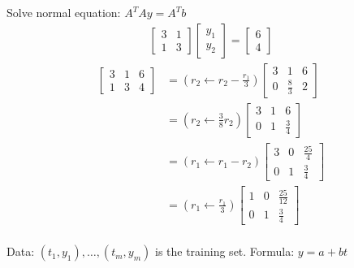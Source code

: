 \documentclass[
	date={October 9{,} 2024},
	month={10},
	day={9}
]{math486notes}
\begin{document}
\begin{example}
	Solve normal equation: $A^{T}Ay=A^{T}b$
	\begin{equation*}
	\begin{aligned}
		\left[ \begin{array}{cc}
			3 & 1\\
			1 & 3
		\end{array} \right]\left[ \begin{array}{c}
			y_{1}\\
			y_{2}
		\end{array} \right] = \left[ \begin{array}{c}
			6\\
			4
		\end{array} \right]
	\end{aligned}
	\end{equation*}
	\begin{equation*}
	\begin{aligned}
		\left[ \begin{array}{cc|c}
			3 & 1 & 6\\
			1 & 3 & 4
		\end{array} \right]
		&= (r_{2} \gets r_{2} - \frac{r_{1}}{3}) \left[ \begin{array}{cc|c}
			3 & 1 & 6\\
			0 & \frac{8}{3} & 2
		\end{array} \right]\\
		&= \left( r_{2} \gets \frac{3}{8}r_{2} \right) \left[ \begin{array}{cc|c}
			3 & 1 & 6\\
			0 & 1 & \frac{3}{4}
		\end{array} \right]\\
		&= \left( r_{1} \gets r_{1} - r_{2} \right) \left[ \begin{array}{cc|c}
			3 & 0 & \frac{25}{4}\\
			0 & 1 & \frac{3}{4}
		\end{array} \right]\\
		&= \left( r_{1} \gets \frac{r_{1}}{3} \right) \left[ \begin{array}{cc|c}
			1 & 0 & \frac{25}{12}\\
			0 & 1 & \frac{3}{4}
		\end{array} \right]\\
	\end{aligned}
	\end{equation*}
\end{example}

Data: $(t_{1}, y_{1}), \dots, (t_{m}, y_{m})$ is the training set.
Formula: $y = a + bt$
\end{document}
